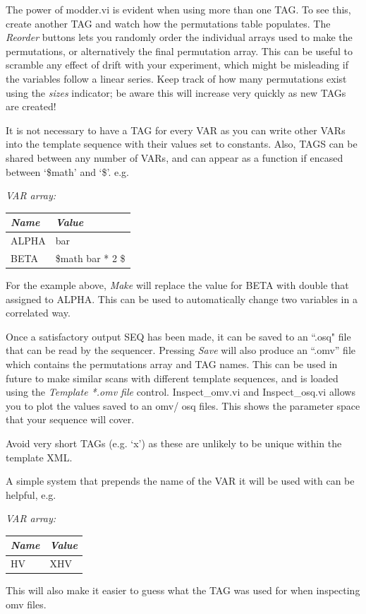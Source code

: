 \documentclass[10pt,a4paper]{article}
\newenvironment{warning}[1]{%
	\tcolorbox[beamer,%
	breakable,
	colback=white,colframe=DarkRed,%
	title=Warning:]}%
{\endtcolorbox}
\begin{document}
The power of modder.vi is evident when using more than one TAG.  To see this, create another TAG and watch how the permutations table populates.  The \emph{Reorder} buttons lets you randomly order the individual arrays used to make the permutations, or alternatively the final permutation array.  This can be useful to scramble any effect of drift with your experiment, which might be misleading if the variables follow a linear series.  Keep track of how many permutations exist using the \emph{sizes} indicator; be aware this will increase very quickly as new TAGs are created!

It is not necessary to have a TAG for every VAR as you can write other VARs into the template sequence with their values set to constants.  Also, TAGS can be shared between any number of VARs, and can appear as a function if encased between `\$math' and `\$'. e.g.

\hangindent=0.7cm
\emph{VAR array:} \\
\begin{tabularx}{0.5\textwidth}{X|X}
	\emph{Name} & \emph{Value} \\
	\hline	
	ALPHA & bar \\
	BETA & \$math bar * 2 \$
\end{tabularx}
\vspace{2mm}

\noindent For the example above, \emph{Make} will replace the value for BETA with double that assigned to ALPHA.  This can be used to automatically change two variables in a correlated way.

Once a satisfactory output SEQ has been made, it can be saved to an ``.osq" file that can be read by the sequencer.  Pressing \emph{Save} will also produce an ``.omv'' file which contains the permutations array and TAG names.  This can be used in future to make similar scans with different template sequences, and is loaded using the \emph{Template *.omv file} control.  Inspect\_omv.vi and Inspect\_osq.vi allows you to plot the values saved to an omv/ osq files. This shows the parameter space that your sequence will cover.

\begin{warning} {}
	Avoid very short TAGs  (e.g. `x') as these are unlikely to be unique within the template XML.
	
	A simple system that prepends the name of the VAR it will be used with can be helpful, e.g.

	\hangindent=0.7cm
	\emph{VAR array:} \\
	\begin{tabularx}{0.5\textwidth}{X|X}
		\emph{Name} & \emph{Value} \\
		\hline
		HV & XHV \\
	\end{tabularx}
	\vspace{2mm}
	
	This will also make it easier to guess what the TAG was used for when inspecting omv files.
\end{warning}
\end{document}
